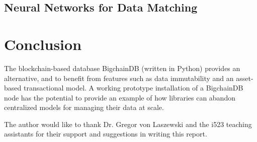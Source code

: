 \documentclass[sigconf]{acmart}
\begin{document}
\subsection{Neural Networks for Data Matching}

\section{Conclusion}
The blockchain-based database BigchainDB (written in Python) provides an alternative,  and to benefit from features such as data immutability and an asset-based transactional model. A working prototype installation of a BigchainDB node has the potential to provide an example of how libraries can abandon centralized models for managing their data at scale.


\begin{acks}
The author would like to thank Dr. Gregor von Laszewski and the i523 teaching assistants for their support and suggestions in writing this report.
\end{acks}


 
\end{document}

